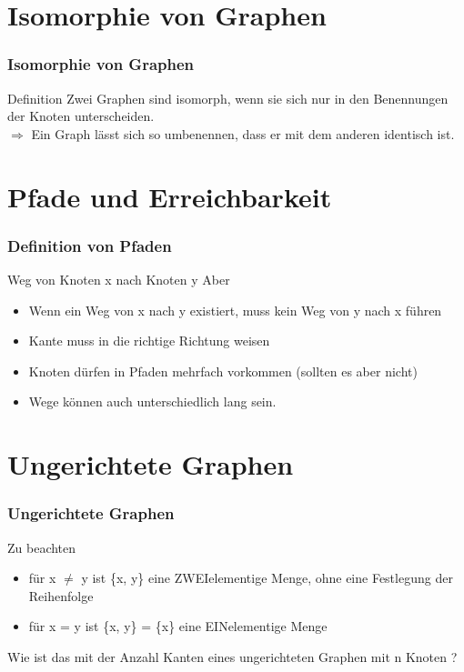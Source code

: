 \documentclass{beamer}
\begin{document}
\section{Isomorphie von Graphen}
\begin{frame}
	\frametitle{Isomorphie von Graphen}
	\begin{block}{Definition}
		Zwei Graphen sind isomorph, wenn sie sich nur in den Benennungen der Knoten unterscheiden.\\
		$\Rightarrow$ Ein Graph lässt sich so umbenennen, dass er mit dem anderen identisch ist.
	\end{block}
\end{frame}

\section{Pfade und Erreichbarkeit}

\begin{frame}
	\frametitle{Definition von Pfaden}
	\begin{block}{Weg von Knoten x nach Knoten y}
		Aber
		\begin{itemize}
			\item Wenn ein Weg von x nach y existiert, muss kein Weg von y nach x f\"uhren
			\item Kante muss in die richtige Richtung weisen
			\item Knoten d\"urfen in Pfaden mehrfach vorkommen (sollten es aber nicht)
			\item Wege k\"onnen auch unterschiedlich lang sein.
		\end{itemize}
	\end{block}
\end{frame}

\section{Ungerichtete Graphen}

\begin{frame}
	\frametitle{Ungerichtete Graphen}
	\begin{block}{Zu beachten}
		\begin{itemize}
			\item f\"ur x $\ne$ y ist \{x, y\} eine ZWEIelementige Menge, ohne eine Festlegung der Reihenfolge
			\item f\"ur x = y ist \{x, y\} = \{x\} eine EINelementige Menge
		\end{itemize}
	\end{block}
	\begin{example}{ }
		Wie ist das mit der Anzahl Kanten eines ungerichteten Graphen mit n Knoten ? 
	
	\end{example}
\end{frame}
\end{document}
